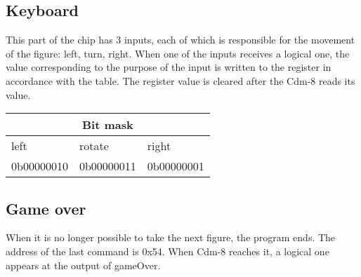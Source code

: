 \documentclass[./main.tex]{subfiles}
\begin{document}
	\subsection{Keyboard}
	
	
	This part of the chip has 3 inputs, each of which is responsible for the movement of the figure: left, turn, right. When one of the inputs receives a logical one, the value corresponding to the purpose of the input is written to the register in accordance with the table. The register value is cleared after the Cdm-8 reads its value.
	\begin{center}
		\begin{tabular}{|p{3cm}|p{3cm}|p{3cm}|}
			\hline
			\multicolumn{3}{|c|}{Bit mask} \\
			\hline
			left & rotate & right \\
			\hline
			0b00000010 & 0b00000011 & 0b00000001 \\
			\hline
		\end{tabular}
	\end{center}
	\subsection{Game over}
	When it is no longer possible to take the next figure, the program ends. The address of the last command is 0x54. When Cdm-8 reaches it, a logical one appears at the output of gameOver.
\end{document}
